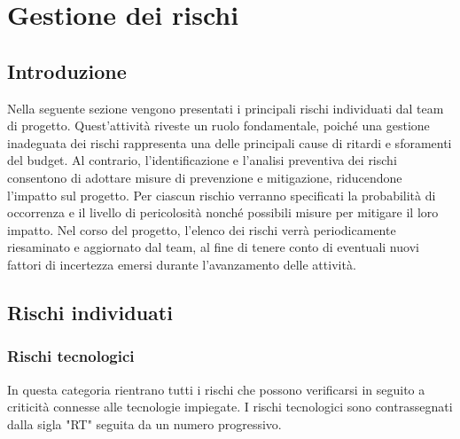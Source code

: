 \documentclass[a4paper,12pt]{article}
\begin{document}
\section{Gestione dei rischi}{
    \subsection{Introduzione}{
        Nella seguente sezione vengono presentati i principali rischi individuati dal team di progetto. Quest'attività riveste un ruolo fondamentale, poiché una gestione inadeguata dei rischi rappresenta una delle principali cause di ritardi e sforamenti del budget. Al contrario, l'identificazione e l'analisi preventiva dei rischi consentono di adottare misure di prevenzione e mitigazione, riducendone l'impatto sul progetto. \newline
        Per ciascun rischio verranno specificati la probabilità di occorrenza e il livello di pericolosità nonché possibili misure per mitigare il loro impatto. \newline
        Nel corso del progetto, l'elenco dei rischi verrà periodicamente riesaminato e aggiornato dal team, al fine di tenere conto di eventuali nuovi fattori di incertezza emersi durante l'avanzamento delle attività.
    }
        
    \subsection{Rischi individuati}
    \label{subsec:rischi} {

        \subsubsection{Rischi tecnologici}
            In questa categoria rientrano tutti i rischi che possono verificarsi in seguito a criticità connesse alle tecnologie impiegate. I rischi tecnologici sono contrassegnati dalla sigla "RT" seguita da un numero progressivo.

}}
\end{document}
